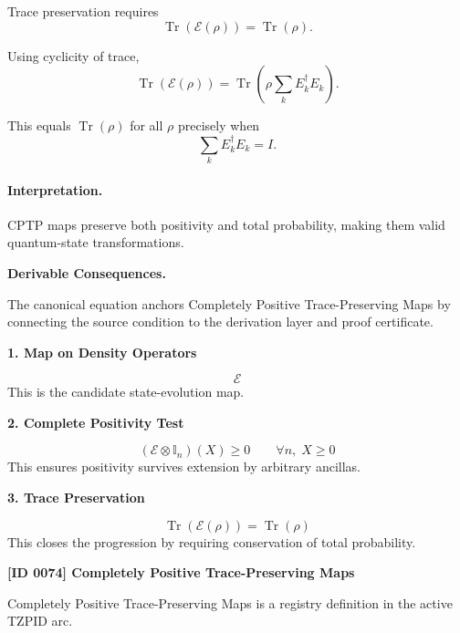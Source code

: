 Trace preservation requires
\begin{equation}
\operatorname{Tr}(\mathcal{E}(\rho))=\operatorname{Tr}(\rho).
\end{equation}

Using cyclicity of trace,
\begin{equation}
\operatorname{Tr}(\mathcal{E}(\rho))
=
\operatorname{Tr}\left(
\rho\sum_k E_k^\dagger E_k
\right).
\end{equation}

This equals $\operatorname{Tr}(\rho)$ for all $\rho$ precisely when
\begin{equation}
\boxed{
\sum_k E_k^\dagger E_k = I .
}
\end{equation}

\paragraph{Interpretation.}
CPTP maps preserve both positivity and total probability, making them valid quantum-state transformations.

\par\vspace{0.35em}
\noindent\textbf{Derivable Consequences.}\quad
\begingroup
\footnotesize
\raggedright
The canonical equation anchors Completely Positive Trace-Preserving Maps by connecting the source condition to the derivation layer and proof certificate.
\par\endgroup

\noindent\textbf{1. Map on Density Operators}\par
\[
\mathcal{E}
\]
\noindent This is the candidate state-evolution map.\par
\noindent\textbf{2. Complete Positivity Test}\par
\[
(\mathcal{E}\otimes \mathbb{I}_{n})(X) \geq 0
\qquad
\forall n,\; X \geq 0
\]
\noindent This ensures positivity survives extension by arbitrary ancillas.\par
\noindent\textbf{3. Trace Preservation}\par
\[
\operatorname{Tr}\!\left(\mathcal{E}(\rho)\right)
=
\operatorname{Tr}(\rho)
\]
\noindent This closes the progression by requiring conservation of total probability.\par

\clearpage
\noindent\textbf{[ID 0074] Completely Positive Trace-Preserving Maps}\par
\vspace{0.35em}
\begingroup\small
{}
Completely Positive Trace-Preserving Maps is a registry definition in the active TZPID arc.

